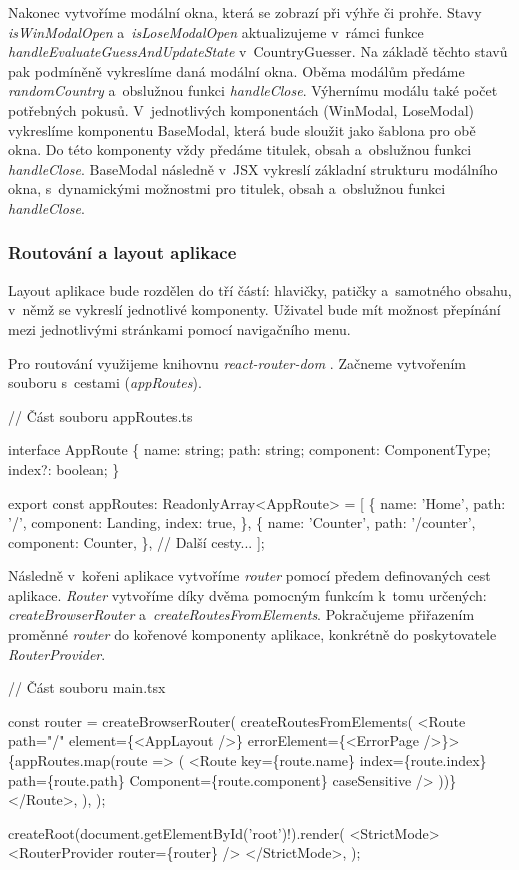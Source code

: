 Nakonec vytvoříme modální okna, která se zobrazí při výhře či prohře. Stavy \emph{isWinModalOpen} a~\emph{isLoseModalOpen} aktualizujeme v~rámci funkce \emph{handleEvaluateGuessAndUpdateState} v~CountryGuesser. 
Na základě těchto stavů pak podmíněně vykreslíme daná modální okna. Oběma modálům předáme \emph{randomCountry} a~obslužnou funkci \emph{handleClose}. Výhernímu modálu také počet potřebných pokusů. 
V~jednotlivých komponentách (WinModal, LoseModal) vykreslíme komponentu BaseModal, která bude sloužit jako šablona pro obě okna. Do této komponenty vždy předáme titulek, obsah a~obslužnou funkci \emph{handleClose}. 
BaseModal následně v~JSX vykreslí základní strukturu modálního okna, s~dynamickými možnostmi pro titulek, obsah a~obslužnou funkci \emph{handleClose}.

\subsubsection*{Routování a layout aplikace}

Layout aplikace bude rozdělen do tří částí: hlavičky, patičky a~samotného obsahu, v~němž se vykreslí jednotlivé komponenty. Uživatel bude mít možnost přepínání mezi jednotlivými stránkami pomocí navigačního menu.

Pro routování využijeme knihovnu \emph{react-router-dom} \cite{reactrouter}. Začneme vytvořením souboru s~cestami (\emph{appRoutes}).

\begin{prog}
// Část souboru appRoutes.ts

interface AppRoute \{
  name: string;
  path: string;
  component: ComponentType;
  index?: boolean;
\}

export const appRoutes: ReadonlyArray<AppRoute> = [
  \{
    name: 'Home',
    path: '/',
    component: Landing,
    index: true,
  \},
  \{
    name: 'Counter',
    path: '/counter',
    component: Counter,
  \},
  // Další cesty...
];
\end{prog}

Následně v~kořeni aplikace vytvoříme \emph{router} pomocí předem definovaných cest aplikace. 
\emph{Router} vytvoříme díky dvěma pomocným funkcím k~tomu určených: \emph{createBrowserRouter} a~\emph{createRoutesFromElements}. 
Pokračujeme přiřazením proměnné \emph{router} do kořenové komponenty aplikace, konkrétně do poskytovatele \emph{RouterProvider}.

\begin{prog}
// Část souboru main.tsx

const router = createBrowserRouter(
  createRoutesFromElements(
    <Route path="/" element=\{<AppLayout />\} errorElement=\{<ErrorPage />\}>
      \{appRoutes.map(route => (
        <Route
          key=\{route.name\}
          index=\{route.index\}
          path=\{route.path\}
          Component=\{route.component\}
          caseSensitive
        />
      ))\}
    </Route>,
  ),
);

createRoot(document.getElementById('root')!).render(
  <StrictMode>
    <RouterProvider router=\{router\} />
  </StrictMode>,
);
\end{prog}

